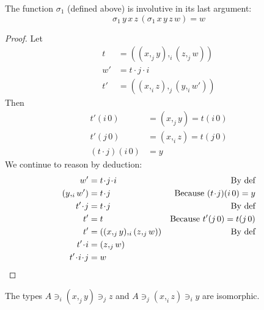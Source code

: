 \documentclass[english]{PaperTools/latex/lipics}
\newcommand\CP[3]{(#2,_{#1} #3)}
\newcommand\param[1]{\!\cdot\!#1}
\newcommand\op[1]{∋_{#1}}
\newcommand\mor[2]{({#1}\,{#2})}
\newcommand\proj[2]{{#2}\mor{#1}0}
\newcommand\projp[2]{\proj{#1}{(#2)}}
\begin{document}
\begin{theorem}
  The function $\sigma_1$ (defined above) is involutive in its last argument:
  \[ \sigma_1\, y\, x\, z\, (\sigma_1\, x\, y\, z\, w) = w \]
\end{theorem}
\begin{proof}
  Let
  \begin{align*}
    t &= \CP i {\CP j x y}{\CP j z w} \\
    w' &= t \param j \param i \\
    t' &= \CP j {\CP i x z}{\CP i y {w'}}
  \end{align*}
  Then
  \begin{align*}
    \proj i {t'} &= \CP j x y = \proj i t \\
    \proj j {t'} &= \CP i x z = \proj j t \\
    \projp i {t\param j} &= y
  \end{align*}
We continue to reason by deduction:
  \begin{align*}
    w' &= t \param j \param i & \text{By def}\\
    {\CP i y {w'}} &= t\param j & \text{Because $\projp i {t\param j} = y $}  \\
    t'\param j &= t\param j & \text{By def}\\
    t' &= t &\text{Because $\proj j {t'} = \proj j t$} \\
    t' &= \CP i {\CP j x y} {\CP j z w} & \text{By def} \\
    t'\param i &= \CP j z w \\
    t'\param i\param j &= w
  \qedhere
  \end{align*}
\end{proof}
\begin{corollary}
  The types $A \op i \CP j x y \op j z$ and $A \op j \CP i x z \op i y$ are isomorphic.
\end{corollary}
\end{document}
